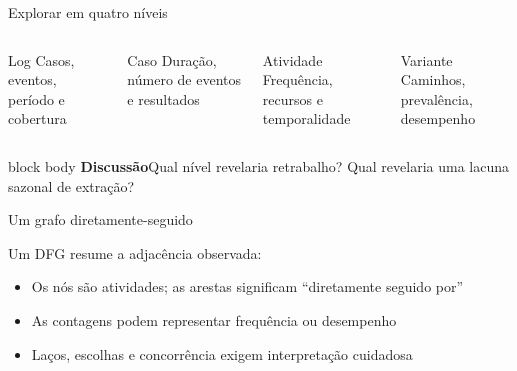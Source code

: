 \documentclass[aspectratio=169,11pt]{beamer}
\newcommand{\promptbox}[1]{%
  \begin{beamercolorbox}[rounded=true,sep=0.65em]{block body}
    \textbf{\color{Coral}Discussão}\quad #1
  \end{beamercolorbox}
}
\begin{document}
\begin{frame}{Explorar em quatro níveis}
  \begin{columns}[T,onlytextwidth]
      \begin{block}{Log}
        Casos, eventos, período e cobertura
      \end{block}
      \begin{block}{Caso}
        Duração, número de eventos e resultados
      \end{block}
      \begin{block}{Atividade}
        Frequência, recursos e temporalidade
      \end{block}
      \begin{block}{Variante}
        Caminhos, prevalência, desempenho
      \end{block}
  \end{columns}
  \vspace{0.55cm}
  \promptbox{Qual nível revelaria retrabalho? Qual revelaria uma lacuna sazonal de extração?}
\end{frame}

\begin{frame}{Um grafo diretamente-seguido}
  \centering

  \vspace{0.45cm}
  Um DFG resume a adjacência observada:
  \begin{itemize}
    \item Os nós são atividades; as arestas significam ``diretamente seguido por''
    \item As contagens podem representar frequência ou desempenho
    \item Laços, escolhas e concorrência exigem interpretação cuidadosa
  \end{itemize}
\end{frame}
\end{document}
